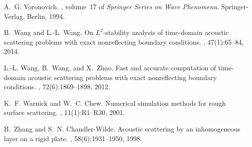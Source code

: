 \documentclass[11pt,reqno]{amsart}
\numberwithin{equation}{section}
\begin{document}
\begin{thebibliography}{10}
A.~G. Voronovich.
, volume~17 of {\em Springer
  Series on Wave Phenomena}.
\newblock Springer-Verlag, Berlin, 1994.

B.~Wang and L.-L. Wang.
\newblock On {$L^2$}-stability analysis of time-domain acoustic scattering
  problems with exact nonreflecting boundary conditions.
, 47(1):65--84, 2014.

L.-L. Wang, B.~Wang, and X.~Zhao.
\newblock Fast and accurate computation of time-domain acoustic scattering
  problems with exact nonreflecting boundary conditions.
, 72(6):1869--1898, 2012.

K.~F. Warnick and W.~C. Chew.
\newblock Numerical simulation methods for rough surface scattering.
, 11(1):R1--R30, 2001.

B.~Zhang and S.~N. Chandler-Wilde.
\newblock Acoustic scattering by an inhomogeneous layer on a rigid plate.
, 58(6):1931--1950, 1998.

\end{thebibliography}
\end{document}
